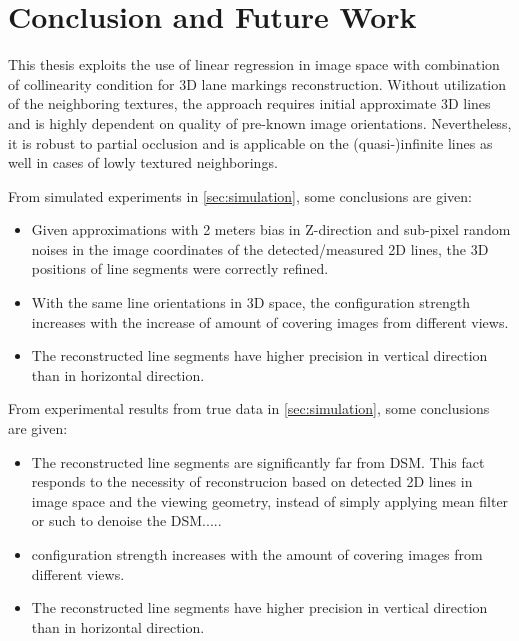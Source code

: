 
\chapter{Conclusion and Future Work}
\label{chap:conclusion}

This thesis exploits the use of linear regression in image space with combination of collinearity condition for 3D lane markings reconstruction. Without utilization of the neighboring textures, the approach requires initial approximate 3D lines and is highly dependent on quality of pre-known image orientations. Nevertheless, it is robust to partial occlusion and is applicable on the (quasi-)infinite lines as well in cases of lowly textured neighborings. 

From simulated experiments in \cref{sec:simulation}, some conclusions are given:
\begin{itemize}
	\item Given approximations with 2 meters bias in Z-direction and sub-pixel random noises in the image coordinates of the detected/measured 2D lines, the 3D positions of line segments were correctly refined.
	
	\item With the same line orientations in 3D space, the configuration strength increases with the increase of amount of covering images from different views.
	
	\item The reconstructed line segments have higher precision in vertical direction than in horizontal direction.
\end{itemize}


From experimental results from true data in \cref{sec:simulation}, some conclusions are given:
\begin{itemize}
	\item The reconstructed line segments are significantly far from DSM. This fact responds to the necessity of reconstrucion based on detected 2D lines in image space and the viewing geometry, instead of simply applying mean filter or such to denoise the DSM.....
	
	\item  configuration strength increases with the amount of covering images from different views.
	\item The reconstructed line segments have higher precision in vertical direction than in horizontal direction.
\end{itemize}



